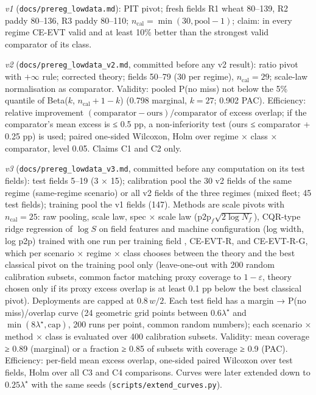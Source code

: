 \documentclass[preprint,12pt,authoryear]{elsarticle}
\begin{document}
\emph{v1} (\texttt{docs/prereg\_lowdata.md}): PIT pivot; fresh fields R1 wheat 80--139, R2 paddy 80--136, R3 paddy 80--110; \(n_\mathrm{cal}=\min(30,\text{pool}-1)\); claim: in every regime CE-EVT valid and at least 10\% better than the strongest valid comparator of its class.

\emph{v2} (\texttt{docs/prereg\_lowdata\_v2.md}, committed before any v2 result): ratio pivot with \(+\infty\) rule; corrected theory; fields 50--79 (30 per regime), \(n_\mathrm{cal}=29\); scale-law normalisation as comparator. Validity: pooled P(no miss) not below the 5\% quantile of Beta(\(k\), \(n_\mathrm{cal}+1-k\)) (0.798 marginal, \(k=27\); 0.902 PAC). Efficiency: relative improvement \((\text{comparator}-\text{ours})/\text{comparator}\) of excess overlap; if the comparator's mean excess is ≤ 0.5 pp, a non-inferiority test (ours ≤ comparator + 0.25 pp) is used; paired one-sided Wilcoxon, Holm over regime × class × comparator, level 0.05. Claims C1 and C2 only.

\emph{v3} (\texttt{docs/prereg\_lowdata\_v3.md}, committed before any computation on its test fields): test fields 5--19 (3 × 15); calibration pool the 30 v2 fields of the same regime (same-regime scenario) or all v2 fields of the three regimes (mixed fleet; 45 test fields); training pool the v1 fields (147). Methods are scale pivots with \(n_\mathrm{cal}=25\): raw pooling, scale law, spec × scale law (\(\mathrm{p2p}_f\sqrt{2\log N_f}\)), CQR-type ridge regression of \(\log S\) on field features and machine configuration (log width, log p2p) trained with one run per training field \citep{romano2019}, CE-EVT-R, and CE-EVT-R-G, which per scenario × regime × class chooses between the theory and the best classical pivot on the training pool only (leave-one-out with 200 random calibration subsets, common factor matching proxy coverage to \(1-\varepsilon\), theory chosen only if its proxy excess overlap is at least 0.1 pp below the best classical pivot). Deployments are capped at \(0.8\,w/2\). Each test field has a margin → P(no miss)/overlap curve (24 geometric grid points between \(0.6\lambda^\star\) and \(\min(8\lambda^\star,\text{cap})\), 200 runs per point, common random numbers); each scenario × method × class is evaluated over 400 calibration subsets. Validity: mean coverage ≥ 0.89 (marginal) or a fraction ≥ 0.85 of subsets with coverage ≥ 0.9 (PAC). Efficiency: per-field mean excess overlap, one-sided paired Wilcoxon over test fields, Holm over all C3 and C4 comparisons. Curves were later extended down to \(0.25\lambda^\star\) with the same seeds (\texttt{scripts/extend\_curves.py}).
\end{document}
